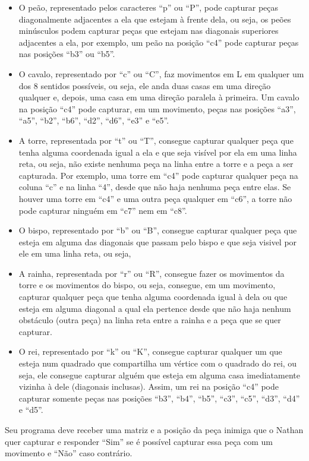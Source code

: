 \begin{itemize}
    \item O peão, representado pelos caracteres ``p'' ou ``P'', pode capturar peças diagonalmente adjacentes a ela que estejam à frente dela, ou seja, os peões minúsculos podem capturar peças que estejam nas diagonais superiores adjacentes a ela, por exemplo, um peão na posição ``c4'' pode capturar peças nas posições ``b3'' ou ``b5''.
    \item O cavalo, representado por ``c'' ou ``C'', faz movimentos em L em qualquer um dos 8 sentidos possíveis, ou seja, ele anda duas casas em uma direção qualquer e, depois, uma casa em uma direção paralela à primeira. Um cavalo na posição ``c4'' pode capturar, em um movimento, peças nas posições ``a3'', ``a5'', ``b2'', ``b6'', ``d2'', ``d6'', ``e3'' e ``e5''.
    \item A torre, representada por ``t'' ou ``T'', consegue capturar qualquer peça que tenha alguma coordenada igual a ela e que seja visível por ela em uma linha reta, ou seja, não existe nenhuma peça na linha entre a torre e a peça a ser capturada. Por exemplo, uma torre em ``c4'' pode capturar qualquer peça na coluna ``c'' e na linha ``4'', desde que não haja nenhuma peça entre elas. Se houver uma torre em ``c4'' e uma outra peça qualquer em ``c6'', a torre não pode capturar ninguém em ``c7'' nem em ``c8''.
    \item O bispo, representado por ``b'' ou ``B'', consegue capturar qualquer peça que esteja em alguma das diagonais que passam pelo bispo e que seja visivel por ele em uma linha reta, ou seja, 
    \item A rainha, representada por ``r'' ou ``R'', consegue fazer os movimentos da torre e os movimentos do bispo, ou seja, consegue, em um movimento, capturar qualquer peça que tenha alguma coordenada igual à dela ou que esteja em alguma diagonal a qual ela pertence desde que não haja nenhum obstáculo (outra peça) na linha reta entre a rainha e a peça que se quer capturar.
    \item O rei, representado por ``k'' ou ``K'', consegue capturar qualquer um que esteja num quadrado que compartilha um vértice com o quadrado do rei, ou seja, ele consegue capturar alguém que esteja em alguma casa imediatamente vizinha à dele (diagonais inclusas). Assim, um rei na posição ``c4'' pode capturar somente peças nas posições ``b3'', ``b4'', ``b5'', ``c3'', ``c5'', ``d3'', ``d4'' e ``d5''.
\end{itemize}
Seu programa deve receber uma matriz e a posição da peça inimiga que o Nathan quer capturar e responder ``Sim'' se é possível capturar essa peça com um movimento e ``Não'' caso contrário.


